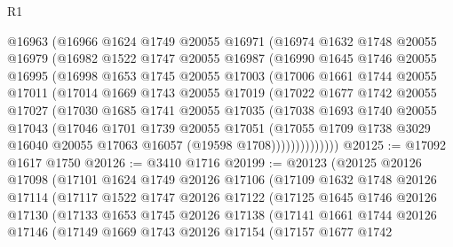 \begin{lexlean}{R1}
\begin{coremodule}
      @16963
      (@16966
        @1624
        @1749
        @20055
        @16971
        (@16974
          @1632
          @1748
          @20055
          @16979
          (@16982
            @1522
            @1747
            @20055
            @16987
            (@16990
              @1645
              @1746
              @20055
              @16995
              (@16998
                @1653
                @1745
                @20055
                @17003
                (@17006
                  @1661
                  @1744
                  @20055
                  @17011
                  (@17014
                    @1669
                    @1743
                    @20055
                    @17019
                    (@17022
                      @1677
                      @1742
                      @20055
                      @17027
                      (@17030
                        @1685
                        @1741
                        @20055
                        @17035
                        (@17038
                          @1693
                          @1740
                          @20055
                          @17043
                          (@17046
                            @1701
                            @1739
                            @20055
                            @17051
                            (@17055
                              @1709
                              @1738
                              @3029
                              @16040
                              @20055
                              @17063
                              @16057
                              (@19598 @1708))))))))))))))
@20125 := @17092 @1617 @1750
@20126 := @3410 @1716
@20199 := @20123
    (@20125
      @20126
      @17098
      (@17101
        @1624
        @1749
        @20126
        @17106
        (@17109
          @1632
          @1748
          @20126
          @17114
          (@17117
            @1522
            @1747
            @20126
            @17122
            (@17125
              @1645
              @1746
              @20126
              @17130
              (@17133
                @1653
                @1745
                @20126
                @17138
                (@17141
                  @1661
                  @1744
                  @20126
                  @17146
                  (@17149
                    @1669
                    @1743
                    @20126
                    @17154
                    (@17157
                      @1677
                      @1742

\end{coremodule}
\end{lexlean}
